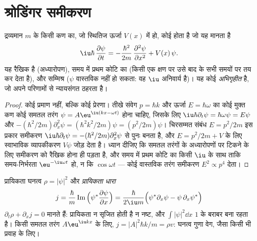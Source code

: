 \section{श्रोडिंगर समीकरण}

\begin{theorem}[श्रोडिंगर समीकरण]\label{thm:b2:schrodinger-wave-functions:equation}
द्रव्यमान $m$ के किसी कण का, जो स्थितिज ऊर्जा $V(x)$ में हो, कोई  होता है जो यह मानता है
\[
\iu\hbar\,\frac{\partial\psi}{\partial t} = -\frac{\hbar^2}{2m}\,\frac{\partial^2\psi}{\partial x^2} + V(x)\,\psi .
\]
यह रैखिक है (अध्यारोपण), समय में प्रथम कोटि का (किसी एक क्षण पर 
उसे बाद के सभी समयों पर तय कर देता है), और सम्मिश्र ($\psi$
वास्तविक नहीं हो सकता: वह $\iu$ अनिवार्य है)। यह कोई \emph{अभिगृहीत} है,
जो अपने परिणामों से न्यायसंगत ठहरता है।
\end{theorem}

\begin{proof}
कोई प्रमाण नहीं, बल्कि कोई प्रेरणा। तीखे संवेग
$p = \hbar k$ और ऊर्जा $E = \hbar\omega$ का कोई मुक्त कण कोई समतल तरंग $\psi =
A\eu^{\iu(kx - \omega t)}$ होना चाहिए, जिसके लिए $\iu\hbar\partial_t\psi = \hbar\omega\psi =
E\psi$ और $-(\hbar^2/2m)\partial_x^2\psi = (\hbar^2k^2/2m)\psi = (p^2/2m)\psi$।
चिरसम्मत संबंध $E = p^2/2m$ इस प्रकार समीकरण
$\iu\hbar\partial_t\psi = -(\hbar^2/2m)\partial_x^2\psi$ से पुनः बनता है, और $E = p^2/2m + V$ के लिए
स्वाभाविक व्यापकीकरण $V\psi$ जोड़ देता है। ध्यान दीजिए कि
समतल तरंगों के अध्यारोपणों पर टिकने के लिए समीकरण को रैखिक होना ही पड़ता है, और
समय में प्रथम कोटि का किसी $\iu$ के साथ ताकि समय-निर्भरता $\eu^{-\iu\omega t}$ हो, न कि
$\cos\omega t$ --- कोई वास्तविक तरंग समीकरण
$E^2 \propto p^4$ देता।
\end{proof}

\begin{proposition}[प्रायिकता का संरक्षण]\label{prop:b2:schrodinger-wave-functions:current}
प्रायिकता घनत्व $\rho = |\psi|^2$ और \emph{प्रायिकता
धारा}
\[
j = \frac{\hbar}{m}\operatorname{Im}\Big(\psi^*\frac{\partial\psi}{\partial x}\Big)
= \frac{\hbar}{2\iu m}\Big(\psi^*\partial_x\psi - \psi\,\partial_x\psi^*\Big)
\]
$\partial_t\rho + \partial_xj = 0$ मानते हैं: प्रायिकता न सृजित होती है न
नष्ट, और $\int|\psi|^2\dd x$ $1$ के बराबर बना रहता है। किसी समतल तरंग
$A\eu^{\iu kx}$ के लिए, $j = |A|^2\hbar k/m = \rho v$: घनत्व गुणा वेग, जैसा
किसी भी प्रवाह के लिए।
\end{proposition}

